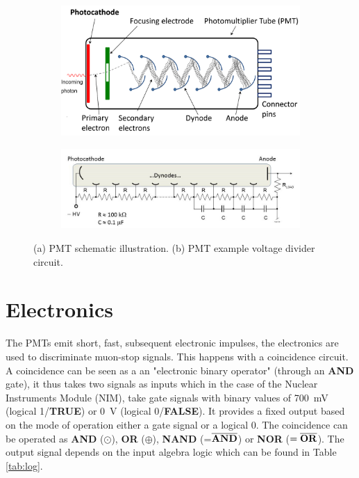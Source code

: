 \begin{figure}
\centering
   \begin{subfigure}[t]{0.49\linewidth}
  \centering
   \includegraphics[width=\linewidth]{./fig/PMT.png}
  \caption{}
\label{sfig:PMT}
  \end{subfigure}
   \begin{subfigure}[t]{0.49\linewidth}
  \centering
   \includegraphics[width=\linewidth]{./fig/PMT_Voltage_Divider.jpg}
  \caption{}
\label{sfig:PVD}
  \end{subfigure}
\caption{(a) PMT schematic illustration. (b) PMT example voltage divider circuit.}
\label{fig:PMT}
\end{figure}


\section{Electronics}

The PMTs emit short, fast, subsequent electronic impulses, the electronics are used to discriminate muon-stop signals. This happens with a coincidence circuit. A coincidence can be seen as a an "electronic binary operator" (through an \textbf{AND} gate), it thus takes two signals as inputs which in the case of the Nuclear Instruments Module (NIM), take gate signals with binary values of \SI{700}{\milli\volt} (logical 1/\textbf{TRUE}) or \SI{0}{\volt} (logical 0/\textbf{FALSE}). It provides a fixed output based on the mode of operation either a gate signal or a logical 0. The coincidence can be operated as \textbf{AND} ($\odot$), \textbf{OR} ($\oplus$), \textbf{NAND} (=$\overline{\text{\textbf{AND}}}$) or \textbf{NOR} ($=\overline{\text{\textbf{OR}}}$). The output signal depends on the input algebra logic which can be found in Table \ref{tab:log}.

